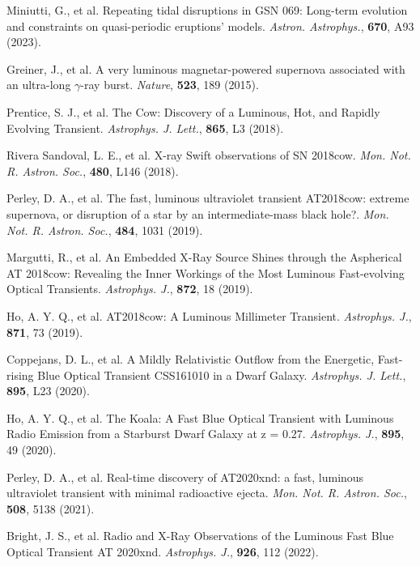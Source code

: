 \documentclass{nature_plusfigure}
\newcommand{\mn}{{Mon. Not. R. Astron. Soc.}}
\newcommand{\mnras}{\mn}
\newcommand{\apj}{{Astrophys. J.}}
\newcommand{\apjl}{{Astrophys. J. Lett.}}
\newcommand{\aap}{{Astron. Astrophys.}}
\newcommand{\nat}{{Nature}}
\begin{document}
\begin{thebibliography}{100}
 Miniutti, G., et al. Repeating tidal disruptions in GSN 069: Long-term evolution and constraints on quasi-periodic eruptions' models. \emph{\aap}, \textbf{670}, A93 (2023). 



 Greiner, J., et al. A very luminous magnetar-powered supernova associated with an ultra-long $\gamma$-ray burst. \emph{\nat}, \textbf{523}, 189 (2015). 

 Prentice, S. J., et al. The Cow: Discovery of a Luminous, Hot, and Rapidly Evolving Transient. \emph{\apjl}, \textbf{865}, L3 (2018). 

  Rivera Sandoval, L. E., et al. X-ray Swift observations of SN 2018cow. \emph{\mnras}, \textbf{480}, L146 (2018). 

 Perley, D. A., et al. The fast, luminous ultraviolet transient AT2018cow: extreme supernova, or disruption of a star by an intermediate-mass black hole?. \emph{\mnras}, \textbf{484}, 1031 (2019). 

 Margutti, R., et al. An Embedded X-Ray Source Shines through the Aspherical AT 2018cow: Revealing the Inner Workings of the Most Luminous Fast-evolving Optical Transients. \emph{\apj}, \textbf{872}, 18 (2019). 

 Ho, A. Y. Q., et al. AT2018cow: A Luminous Millimeter Transient. \emph{\apj}, \textbf{871}, 73 (2019). 


 Coppejans, D. L., et al. A Mildly Relativistic Outflow from the Energetic, Fast-rising Blue Optical Transient CSS161010 in a Dwarf Galaxy. \emph{\apjl}, \textbf{895}, L23 (2020). 

 Ho, A. Y. Q., et al. The Koala: A Fast Blue Optical Transient with Luminous Radio Emission from a Starburst Dwarf Galaxy at z = 0.27. \emph{\apj}, \textbf{895}, 49 (2020). 

 Perley, D. A., et al. Real-time discovery of AT2020xnd: a fast, luminous ultraviolet transient with minimal radioactive ejecta. \emph{\mnras}, \textbf{508}, 5138 (2021). 

  Bright, J. S., et al. Radio and X-Ray Observations of the Luminous Fast Blue Optical Transient AT 2020xnd. \emph{\apj}, \textbf{926}, 112 (2022). 


\end{thebibliography}
\end{document}

